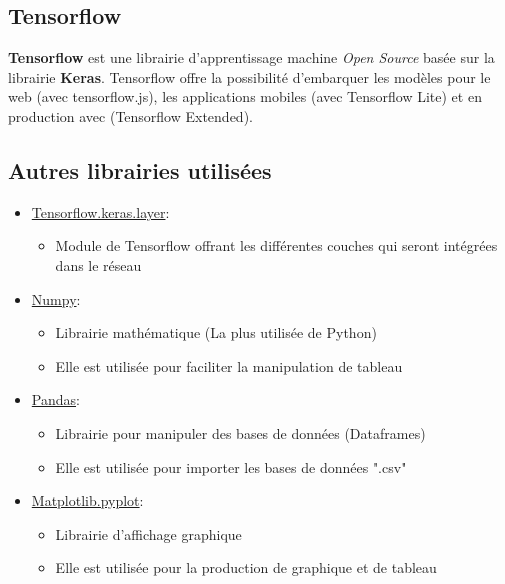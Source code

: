\documentclass{article}
\begin{document}
\subsection{Tensorflow}
\textbf{Tensorflow} est une librairie d'apprentissage machine \textit{Open Source} basée sur la librairie \textbf{Keras}. Tensorflow offre la possibilité d'embarquer les modèles pour le web (avec tensorflow.js), les applications mobiles (avec Tensorflow Lite) et en production avec (Tensorflow Extended).

\subsection{Autres librairies utilisées}

\begin{itemize}
  \item \href{https://www.tensorflow.org/api_docs/python/tf/keras/layers}{Tensorflow.keras.layer}:
    \begin{itemize}
      \item Module de Tensorflow offrant les différentes couches qui seront intégrées dans le réseau
    \end{itemize}
  \item \href{https://numpy.org/doc/stable/user/numpy-for-matlab-users.html}{Numpy}:
    \begin{itemize}
      \item Librairie mathématique (La plus utilisée de Python)
      \item Elle est utilisée pour faciliter la manipulation de tableau
    \end{itemize}
  \item \href{https://pandas.pydata.org/docs/getting_started/index.html#getting-started}{Pandas}:
    \begin{itemize}
      \item Librairie pour manipuler des bases de données (Dataframes)
      \item Elle est utilisée pour importer les bases de données ".csv"
    \end{itemize}
  \item \href{https://matplotlib.org/gallery/index.html#}{Matplotlib.pyplot}:
    \begin{itemize}
      \item Librairie d'affichage graphique
      \item Elle est utilisée pour la production de graphique et de tableau
    \end{itemize}

\end{itemize}
\end{document}
